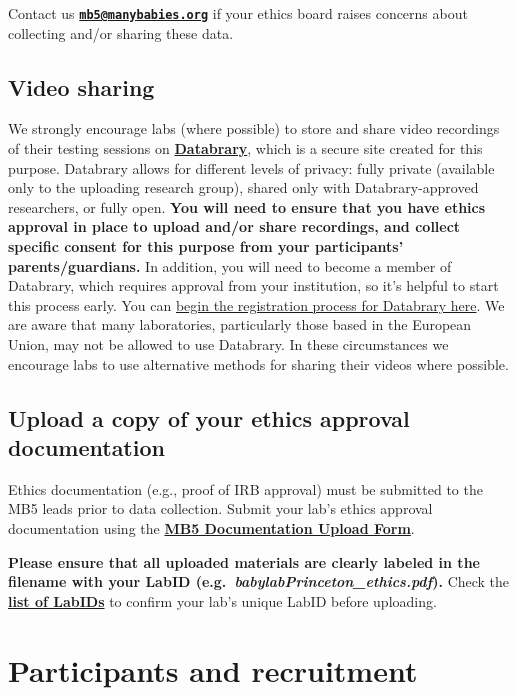 \documentclass[
]{book}
\begin{document}
Contact us \textbf{\href{mailto:mb5@manybabies.org}{\nolinkurl{mb5@manybabies.org}}} if your ethics board raises concerns about collecting and/or sharing these data.

\subsection{Video sharing}\label{video-sharing}

We strongly encourage labs (where possible) to store and share video recordings of their testing sessions on \textbf{\href{https://nyu.databrary.org/}{Databrary}}, which is a secure site created for this purpose. Databrary allows for different levels of privacy: fully private (available only to the uploading research group), shared only with Databrary-approved researchers, or fully open. \textbf{You will need to ensure that you have ethics approval in place to upload and/or share recordings, and collect specific consent for this purpose from your participants' parents/guardians.} In addition, you will need to become a member of Databrary, which requires approval from your institution, so it's helpful to start this process early. You can \href{https://nyu.databrary.org/user/register?page=create}{begin the registration process for Databrary here}. We are aware that many laboratories, particularly those based in the European Union, may not be allowed to use Databrary. In these circumstances we encourage labs to use alternative methods for sharing their videos where possible.

\subsection{Upload a copy of your ethics approval documentation}\label{ethics-upload}

Ethics documentation (e.g., proof of IRB approval) must be submitted to the MB5 leads prior to data collection. Submit your lab's ethics approval documentation using the \textbf{\href{https://docs.google.com/forms/d/e/1FAIpQLScTTmcQl1P1F4UWe95Jo7u5bken40AyAefXCYUJ9iYbnWaG8Q/viewform?usp=sf_link}{MB5 Documentation Upload Form}}.

\textbf{Please ensure that all uploaded materials are clearly labeled in the filename with your LabID (e.g.~\emph{babylabPrinceton\_ethics.pdf}).} Check the \textbf{\href{https://manybabies.org/labids/}{list of LabIDs}} to confirm your lab's unique LabID before uploading.

\section{Participants and recruitment}\label{participants-and-recruitment}
\end{document}
